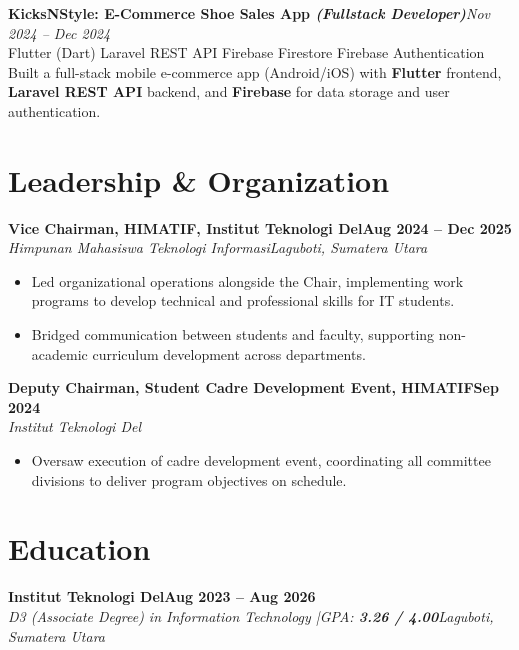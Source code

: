 \documentclass[9.5pt,a4paper]{article}
\newcommand{\cvheading}[4]{%
  {\textbf{#1}\hfill\textbf{#2}\\
  \textit{\color{accentgray}#3}\hfill\textit{\color{accentgray}#4}}
}
\newcommand{\cvproject}[3]{%
  {\textbf{#1}\hfill\textit{\color{accentgray}#2}\\
  \footnotesize\color{accentgray}#3}
}
\begin{document}
\vspace{3pt}

\cvproject{KicksNStyle: E-Commerce Shoe Sales App \normalfont\textit{(Fullstack Developer)}}{Nov 2024 -- Dec 2024}{Flutter (Dart) \textbullet{} Laravel REST API \textbullet{} Firebase Firestore \textbullet{} Firebase Authentication}\\[1pt]
Built a full-stack mobile e-commerce app (Android/iOS) with \textbf{Flutter} frontend, \textbf{Laravel REST API} backend, and \textbf{Firebase} for data storage and user authentication.

\section{Leadership \& Organization}

\cvheading{Vice Chairman, HIMATIF, Institut Teknologi Del}{Aug 2024 -- Dec 2025}{Himpunan Mahasiswa Teknologi Informasi}{Laguboti, Sumatera Utara}
\begin{itemize}
  \item Led organizational operations alongside the Chair, implementing work programs to develop technical and professional skills for IT students.
  \item Bridged communication between students and faculty, supporting non-academic curriculum development across departments.
\end{itemize}

\vspace{3pt}

\cvheading{Deputy Chairman, Student Cadre Development Event, HIMATIF}{Sep 2024}{Institut Teknologi Del}{}
\begin{itemize}
  \item Oversaw execution of cadre development event, coordinating all committee divisions to deliver program objectives on schedule.
\end{itemize}

\section{Education}

\cvheading{Institut Teknologi Del}{Aug 2023 -- Aug 2026}{D3 (Associate Degree) in Information Technology \quad|\quad GPA: \textbf{3.26 / 4.00}}{Laguboti, Sumatera Utara}

\end{document}
